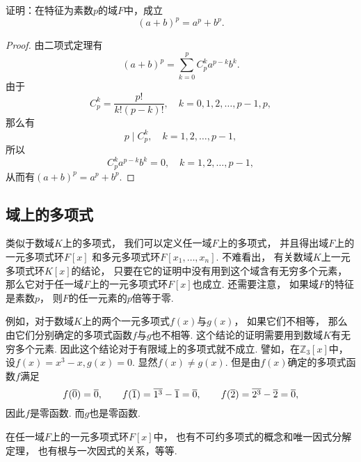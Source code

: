 \begin{example}\label{example:域.域上的特征恒等式}
证明：在特征为素数\(p\)的域\(F\)中，成立\begin{equation*}
	(a+b)^p = a^p + b^p.
\end{equation*}
\begin{proof}
由二项式定理有\begin{equation*}
	(a+b)^p
	= \sum_{k=0}^p C_p^k a^{p-k} b^k.
\end{equation*}
由于\begin{equation*}
	C_p^k = \frac{p!}{k!(p-k)!},
	\quad k=0,1,2,\dotsc,p-1,p,
\end{equation*}
那么有\begin{equation*}
	p \mid C_p^k,
	\quad k=1,2,\dotsc,p-1,
\end{equation*}
所以\begin{equation*}
	C_p^k a^{p-k} b^k = 0,
	\quad k=1,2,\dotsc,p-1,
\end{equation*}
从而有\((a+b)^p = a^p + b^p\).
\end{proof}
\end{example}

\subsection{域上的多项式}
类似于数域\(K\)上的多项式，
我们可以定义任一域\(F\)上的多项式，
并且得出域\(F\)上的一元多项式环\(F[x]\)
和多元多项式环\(F[x_1,\dotsc,x_n]\).
不难看出，
有关数域\(K\)上一元多项式环\(K[x]\)的结论，
只要在它的证明中没有用到这个域含有无穷多个元素，
那么它对于任一域\(F\)上的一元多项式环\(F[x]\)也成立.
还需要注意，
如果域\(F\)的特征是素数\(p\)，
则\(F\)的任一元素的\(p\)倍等于零.

例如，对于数域\(K\)上的两个一元多项式\(f(x)\)与\(g(x)\)，
如果它们不相等，
那么由它们分别确定的多项式函数\(f\)与\(g\)也不相等.
这个结论的证明需要用到数域\(K\)有无穷多个元素.
因此这个结论对于有限域上的多项式就不成立.
譬如，在\(\mathbb{Z}_3[x]\)中，
设\(f(x)=x^3-x,
g(x)=0\).
显然\(f(x) \neq g(x)\).
但是由\(f(x)\)确定的多项式函数\(f\)满足\begin{equation*}
	f(\EquivalenceClassO{0})=\EquivalenceClassO{0}, \qquad
	f(\EquivalenceClassO{1})=\EquivalenceClassO{1^3}-\EquivalenceClassO{1}=\EquivalenceClassO{0}, \qquad
	f(\EquivalenceClassO{2})=\EquivalenceClassO{2^3}-\EquivalenceClassO{2}=\EquivalenceClassO{0},
\end{equation*}
因此\(f\)是零函数.
而\(g\)也是零函数.

在任一域\(F\)上的一元多项式环\(F[x]\)中，
也有不可约多项式的概念和唯一因式分解定理，
也有根与一次因式的关系，等等.

